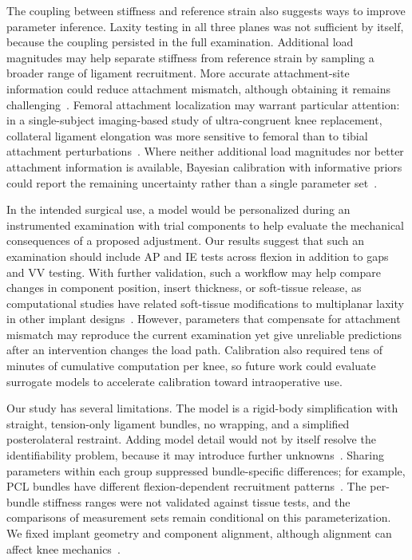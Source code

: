The coupling between stiffness and reference strain also suggests ways to improve parameter inference.
Laxity testing in all three planes was not sufficient by itself, because the coupling persisted in the full examination.
Additional load magnitudes may help separate stiffness from reference strain by sampling a broader range of ligament recruitment.
More accurate attachment-site information could reduce attachment mismatch, although obtaining it remains challenging~\autocite{rachmat2014generating}.
Femoral attachment localization may warrant particular attention: in a single-subject imaging-based study of ultra-congruent knee replacement, collateral ligament elongation was more sensitive to femoral than to tibial attachment perturbations~\autocite{hosseininasab2020length}.
Where neither additional load magnitudes nor better attachment information is available, Bayesian calibration with informative priors could report the remaining uncertainty rather than a single parameter set~\autocite{kennedy2001bayesian,razu2023bayesian}.

In the intended surgical use, a model would be personalized during an instrumented examination with trial components to help evaluate the mechanical consequences of a proposed adjustment.
Our results suggest that such an examination should include AP and IE tests across flexion in addition to gaps and VV testing.
With further validation, such a workflow may help compare changes in component position, insert thickness, or soft-tissue release, as computational studies have related soft-tissue modifications to multiplanar laxity in other implant designs~\autocite{amiri2012computational}.
However, parameters that compensate for attachment mismatch may reproduce the current examination yet give unreliable predictions after an intervention changes the load path.
Calibration also required tens of minutes of cumulative computation per knee, so future work could evaluate surrogate models to accelerate calibration toward intraoperative use.

Our study has several limitations.
The model is a rigid-body simplification with straight, tension-only ligament bundles, no wrapping, and a simplified posterolateral restraint.
Adding model detail would not by itself resolve the identifiability problem, because it may introduce further unknowns~\autocite{transtrum2015perspective}.
Sharing parameters within each group suppressed bundle-specific differences; for example, PCL bundles have different flexion-dependent recruitment patterns~\autocite{amis2006anatomy}.
The per-bundle stiffness ranges were not validated against tissue tests, and the comparisons of measurement sets remain conditional on this parameterization.
We fixed implant geometry and component alignment, although alignment can affect knee mechanics~\autocite{smith2016influence}.

